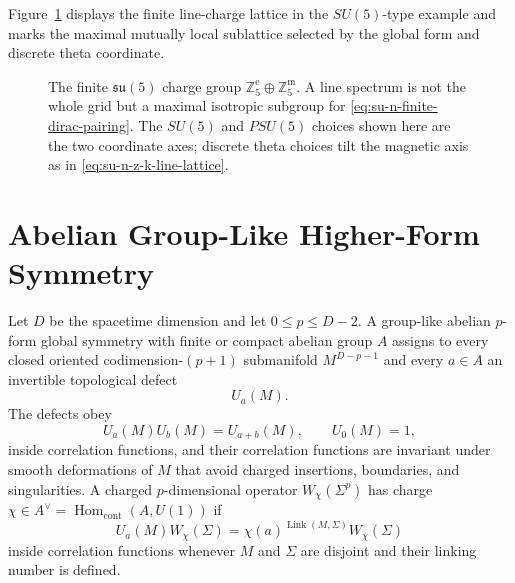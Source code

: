 Figure~\ref{fig:su5-line-charge-lattice} displays the finite line-charge
lattice in the \(SU(5)\)-type example and marks the maximal mutually local
sublattice selected by the global form and discrete theta coordinate.

\begin{figure}[H]
\centering
{}
\caption{The finite \(\mathfrak{su}(5)\) charge group
\(\mathbb Z_5^{\mathrm e}\oplus\mathbb Z_5^{\mathrm m}\).  A line spectrum is not the
whole grid but a maximal isotropic subgroup for
\eqref{eq:su-n-finite-dirac-pairing}.  The \(SU(5)\) and \(PSU(5)\) choices
shown here are the two coordinate axes; discrete theta choices tilt the
magnetic axis as in \eqref{eq:su-n-z-k-line-lattice}.}
\label{fig:su5-line-charge-lattice}
\end{figure}

\section{Abelian Group-Like Higher-Form Symmetry}

\begin{definition}
\label{def:p-form-global-symmetry}
Let \(D\) be the spacetime dimension and let \(0\leq p\leq D-2\).  A
group-like abelian \(p\)-form global symmetry with finite or compact abelian
group \(A\) assigns to every closed oriented codimension-\((p+1)\)
submanifold \(M^{D-p-1}\) and every \(a\in A\) an invertible topological defect
\[
  U_a(M).
\]
The defects obey
\[
  U_a(M)U_b(M)=U_{a+b}(M),
  \qquad
  U_0(M)=1,
\]
inside correlation functions, and their correlation functions are invariant
under smooth deformations of \(M\) that avoid charged insertions, boundaries,
and singularities.  A charged \(p\)-dimensional operator
\(W_\chi(\Sigma^p)\) has charge
\(\chi\in A^\vee=\operatorname{Hom}_{\mathrm{cont}}(A,U(1))\) if
\begin{equation}
  U_a(M)W_\chi(\Sigma)
  =
  \chi(a)^{\operatorname{Link}(M,\Sigma)}
  W_\chi(\Sigma)
  \label{eq:higher-form-linking-action}
\end{equation}
inside correlation functions whenever \(M\) and \(\Sigma\) are disjoint and
their linking number is defined.
\end{definition}


